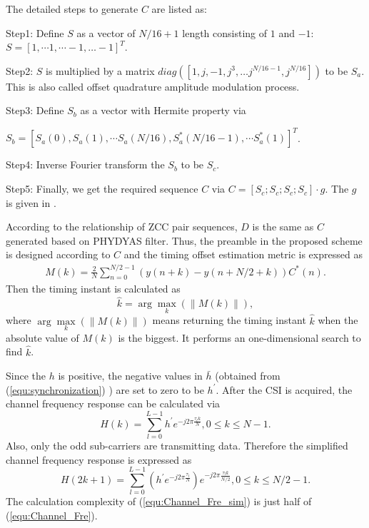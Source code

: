 \documentclass[10pt,journal]{IEEEtran}
\begin{document}
	The detailed steps to generate $ C $ are listed as:

    Step1: Define $S$ as a vector of $N/16+1$ length consisting of $1$ and $-1$:
        $S=[1, \cdots 1, \cdots -1, \ldots -1]^T$.

    Step2: $S$ is multiplied by a matrix $diag([1,j,-1,j^3,\ldots j^{N/16-1},j^{N/16}])$ to be $S_{a}$. This is also called offset quadrature amplitude modulation process.

    Step3: Define $S_b$ as a vector with Hermite property via

        $S_b=[S_{a}(0),S_{a}(1),\cdots S_{a}(N/16),S_{a}^*(N/16-1),\cdots S_{a}^*(1)]^T$.

	Step4: Inverse Fourier transform the $S_b$ to be $S_c$.

    Step5: Finally, we get the required sequence $C$ via $C=[ S_c; S_c; S_c; S_c]\cdot g$. The $g$ is given in \cite{Bellanger2010}.

    According to the relationship of ZCC pair sequences, $D$ is the same as $C$ generated based on PHYDYAS filter. Thus, the preamble in the proposed scheme is designed according to $C$ and the timing offset estimation metric is expressed as
    \begin{eqnarray}\label{equ:synchronization}
          M(k)=\frac{2}{N}\sum_{n=0}^{N/2-1}(y(n+k)-y(n+N/2+k))C^*(n).
    \end{eqnarray}
    Then the timing instant is calculated as
    \begin{equation}\label{equ:d}
            \hat k=\arg\max\limits_{k}(\|M(k)\|),
    \end{equation}
    where $\arg\max\limits_{k}(\|M(k)\|)$ means returning the timing instant $\hat k$ when the absolute value of $M(k)$ is the biggest. It performs an one-dimensional search to find $\hat k$.

    Since the $ h $ is positive, the negative values in $ \bar{h} $ (obtained from (\ref{equ:synchronization}) ) are set to zero to be $ h^{'} $. After the CSI is acquired, the channel frequency response can be calculated via
    \begin{equation}\label{equ:Channel_Fre}
          H(k)=\sum_{l=0}^{L-1}h^{'}e^{-j2\pi\frac{\tau_l k}{N}},0\leq k \leq N-1.
    \end{equation}
    Also, only the odd sub-carriers are transmitting data. Therefore the simplified channel frequency response is expressed as
    \begin{equation}\label{equ:Channel_Fre_sim}
          H(2k+1)=\sum_{l=0}^{L-1}(h^{'}e^{-j2\pi\frac{\tau_l}{N}})e^{-j2\pi\frac{\tau_l k}{N/2}},0\leq k\leq N/2-1.
    \end{equation}
    The calculation complexity of (\ref{equ:Channel_Fre_sim}) is just half of (\ref{equ:Channel_Fre}).
\end{document}
